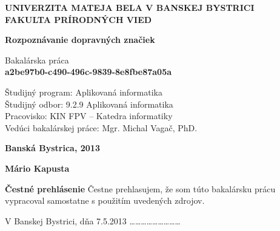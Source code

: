 \documentclass[12pt]{article}
\begin{document}
\begin{titlepage}

\begin{center}

\begin{spacing}{1.5} 
{\Large \bfseries UNIVERZITA MATEJA BELA V BANSKEJ BYSTRICI\\
FAKULTA PRÍRODNÝCH VIED}\\[5cm]
\end{spacing}

\begin{spacing}{1.5} 
{\Large \bfseries Rozpoznávanie dopravných značiek}\\
\end{spacing}

{\large Bakalárska práca}\\
\bfseries a2be97b0-c490-496c-9839-8e8fbe87a05a\\[5cm]
\end{center}

\begin{flushleft}
Študijný program: Aplikovaná informatika\\
Študijný odbor: 9.2.9 Aplikovaná informatika\\
Pracovisko: KIN FPV – Katedra informatiky\\
Vedúci bakalárskej práce: Mgr. Michal Vagač, PhD.\\

\end{flushleft}

\vfill

\begin{minipage}{0.5\textwidth}
\begin{flushleft}
\textbf{Banská Bystrica, 2013}
\end{flushleft}
\end{minipage}
\begin{minipage}{0.5\textwidth}
\begin{flushright}
\textbf{Mário Kapusta}
\end{flushright}
\end{minipage}
\end{titlepage}
\thispagestyle{empty}
\null
\vfill
\textbf{Čestné prehlásenie}
Čestne prehlasujem, že som túto bakalársku prácu vypracoval samostatne s použitím
uvedených zdrojov.
\begin{multicols}{2}
V Banskej Bystrici, dňa 7.5.2013
\columnbreak
\flushright \ldots \ldots \ldots \ldots \ldots \ldots \ldots \ldots \ldots
\end{multicols}
\thispagestyle{empty}
\clearpage
\null
\vfill
\end{document}
